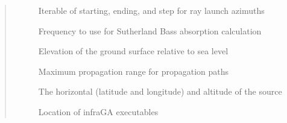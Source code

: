 \documentclass[letterpaper,10pt,english]{sphinxmanual}
\begin{document}
\begin{fulllineitems}
\begin{quote}
\begin{description}
\begin{description}
\item[{}] \leavevmode
Iterable of starting, ending, and step for ray launch azimuths

\item[{}] \leavevmode
Frequency to use for Sutherland Bass absorption calculation

\item[{}] \leavevmode
Elevation of the ground surface relative to sea level

\item[{}] \leavevmode
Maximum propagation range for propagation paths

\item[{}] \leavevmode
The horizontal (latitude and longitude) and altitude of the source

\item[{}] \leavevmode
Location of infraGA executables

\end{description}

\end{description}\end{quote}

\end{fulllineitems}

\end{document}
